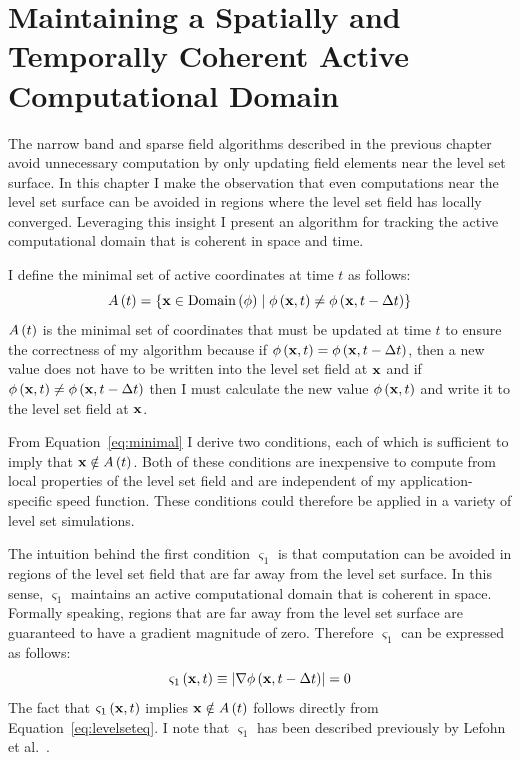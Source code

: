 \fancyhead[RO,LE]{\thepage}
\fancyfoot{} 
\chapter{Maintaining a Spatially and Temporally Coherent Active Computational Domain}
\label{chapter:temporal}

The narrow band and sparse field algorithms described in the previous chapter avoid unnecessary computation by only updating field elements near the level set surface. In this chapter I make the observation that even computations near the level set surface can be avoided in regions where the level set field has locally converged. Leveraging this insight I present an algorithm for tracking the active computational domain that is coherent in space and time.

I define the minimal set of active coordinates at time $t$ as follows:
\begin{equation}
    A \leftbracket t \rightbracket = \leftcbracket \boldx \in \domainphi \mid \phixt \ne \phixtmdt \rightcbracket
\label{eq:minimal}
\end{equation}
$A\left( t \right)$ is the minimal set of coordinates that must be updated at time $t$ to ensure the correctness of my algorithm because if $\mathit{\phi} \left( {\mathbf x} , t \right) = \mathit{\phi} \left( {\mathbf x} , t - \Delta t \right)$, then a new value does not have to be written into the level set field at ${\mathbf x}$ and if $\mathit{\phi} \left( {\mathbf x} , t \right) \neq \mathit{\phi} \left( {\mathbf x} , t - \Delta t \right)$ then I must calculate the new value $\mathit{\phi} \left( {\mathbf x} , t \right)$ and write it to the level set field at ${\mathbf x}$. 

From Equation~\ref{eq:minimal} I derive two conditions, each of which is sufficient to imply that $ {\mathbf x}  \notin A \left( t \right) $. Both of these conditions are inexpensive to compute from local properties of the level set field and are independent of my application-specific speed function. These conditions could therefore be applied in a variety of level set simulations.

The intuition behind the first condition ${ \varsigma }_{1}$ is that computation can be avoided in regions of the level set field that are far away from the level set surface. In this sense, ${ \varsigma }_{1}$ maintains an active computational domain that is coherent in space. Formally speaking, regions that are far away from the level set surface are guaranteed to have a gradient magnitude of zero. Therefore ${ \varsigma }_{1}$ can be expressed as follows:
\begin{equation}
    \conditionone \equiv \leftvbracket \nabla \phixtmdt \rightvbracket = 0
\label{eq:conditionone}
\end{equation}
The fact that ${ \varsigma }_{1} \left( {\mathbf x} , t \right)$ implies ${\mathbf x} \notin A\left( t \right)$ follows directly from  Equation~\ref{eq:levelseteq}. I note that ${ \varsigma }_{1}$ has been described previously by Lefohn et al.~\cite{Lefohn-2003-Vis,Lefohn-2004}.


